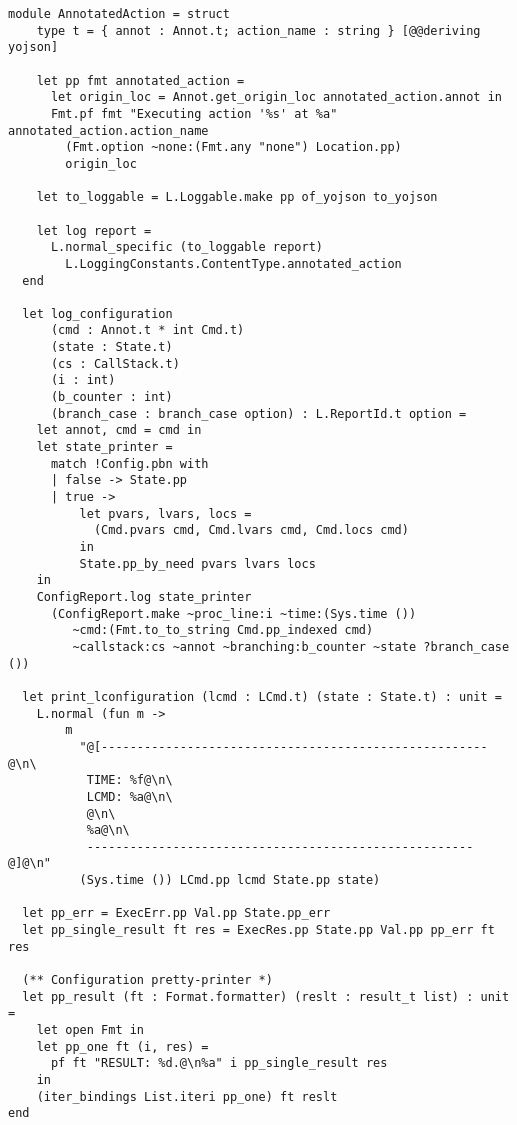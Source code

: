 \begin{lstlisting}[caption={
  Logging types for the interpreter, inside the \texttt{GInterpreter} module
  \label{lst:interpreter-logging}}, style=code]
  module AnnotatedAction = struct
    type t = { annot : Annot.t; action_name : string } [@@deriving yojson]

    let pp fmt annotated_action =
      let origin_loc = Annot.get_origin_loc annotated_action.annot in
      Fmt.pf fmt "Executing action '%s' at %a" annotated_action.action_name
        (Fmt.option ~none:(Fmt.any "none") Location.pp)
        origin_loc

    let to_loggable = L.Loggable.make pp of_yojson to_yojson

    let log report =
      L.normal_specific (to_loggable report)
        L.LoggingConstants.ContentType.annotated_action
  end

  let log_configuration
      (cmd : Annot.t * int Cmd.t)
      (state : State.t)
      (cs : CallStack.t)
      (i : int)
      (b_counter : int)
      (branch_case : branch_case option) : L.ReportId.t option =
    let annot, cmd = cmd in
    let state_printer =
      match !Config.pbn with
      | false -> State.pp
      | true ->
          let pvars, lvars, locs =
            (Cmd.pvars cmd, Cmd.lvars cmd, Cmd.locs cmd)
          in
          State.pp_by_need pvars lvars locs
    in
    ConfigReport.log state_printer
      (ConfigReport.make ~proc_line:i ~time:(Sys.time ())
         ~cmd:(Fmt.to_to_string Cmd.pp_indexed cmd)
         ~callstack:cs ~annot ~branching:b_counter ~state ?branch_case ())

  let print_lconfiguration (lcmd : LCmd.t) (state : State.t) : unit =
    L.normal (fun m ->
        m
          "@[------------------------------------------------------@\n\
           TIME: %f@\n\
           LCMD: %a@\n\
           @\n\
           %a@\n\
           ------------------------------------------------------@]@\n"
          (Sys.time ()) LCmd.pp lcmd State.pp state)

  let pp_err = ExecErr.pp Val.pp State.pp_err
  let pp_single_result ft res = ExecRes.pp State.pp Val.pp pp_err ft res

  (** Configuration pretty-printer *)
  let pp_result (ft : Format.formatter) (reslt : result_t list) : unit =
    let open Fmt in
    let pp_one ft (i, res) =
      pf ft "RESULT: %d.@\n%a" i pp_single_result res
    in
    (iter_bindings List.iteri pp_one) ft reslt
end
\end{lstlisting}

